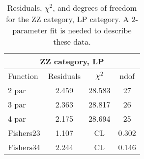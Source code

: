\begin{table}[htb]
\centering
\begin{tabular}{|l c c c |}
\hline
\multicolumn{4}{|c|}{ZZ category, LP}\\
\hline
Function & Residuals & $\chi^2$ & ndof \\
\hline
2 par & 2.459 & 28.583 & 27 \\
3 par & 2.363 & 28.817 & 26 \\
4 par & 2.175 & 28.694 & 25 \\
\hline
\hline
Fishers23  & 1.107 & CL &0.302\\
Fishers34  & 2.244 & CL &0.146\\
\hline
\end{tabular}
\caption{Residuals, $\chi^{2}$, and degrees of freedom for the ZZ category, LP category. A 2-parameter fit is needed to describe these data.}
\label{tab:ZZ category, LP}
\end{table}
